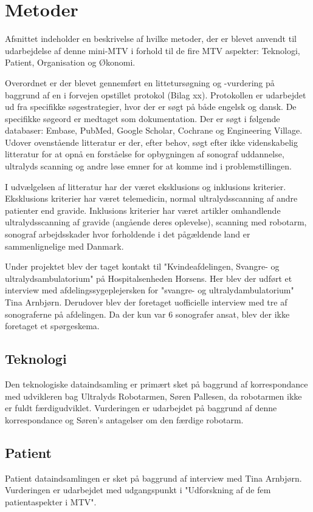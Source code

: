 \chapter{Metoder}
Afsnittet indeholder en beskrivelse af hvilke metoder, der er blevet anvendt til udarbejdelse af denne mini-MTV i forhold til de fire MTV aspekter: Teknologi, Patient, Organisation og Økonomi.

Overordnet er der blevet gennemført en littetursøgning og -vurdering på baggrund af en i forvejen opstillet protokol (Bilag xx). Protokollen er udarbejdet ud fra specifikke søgestrategier, hvor der er søgt på både engelsk og dansk. De specifikke søgeord er medtaget som dokumentation. Der er søgt i følgende databaser: Embase, PubMed, Google Scholar, Cochrane og Engineering Village. \\
Udover ovenstående litteratur er der, efter behov, søgt efter ikke videnskabelig litteratur for at opnå en forståelse for opbygningen af sonograf uddannelse, ultralyds scanning og andre løse emner for at komme ind i problemstillingen. 

I udvælgelsen af litteratur har der været eksklusions og inklusions kriterier. Eksklusions kriterier har været telemedicin, normal ultralydsscanning af andre patienter end gravide. Inklusions kriterier har været artikler omhandlende ultralydsscanning af gravide (angående deres oplevelse), scanning med robotarm, sonograf arbejdsskader hvor forholdende i det pågældende land er sammenlignelige med Danmark. 

Under projektet blev der taget kontakt til "Kvindeafdelingen, Svangre- og ultralydsambulatorium" på Hospitalsenheden Horsens. Her blev der udført et interview med afdelingssygeplejersken for "svangre- og ultralydambulatorium" Tina Arnbjørn. Derudover blev der foretaget uofficielle interview med tre af sonograferne på afdelingen. Da der kun var 6 sonografer ansat, blev der ikke foretaget et spørgeskema. 

\section{Teknologi}
Den teknologiske dataindsamling er primært sket på baggrund af korrespondance med udvikleren bag Ultralyds Robotarmen, Søren Pallesen, da robotarmen ikke er fuldt færdigudviklet. Vurderingen er udarbejdet på baggrund af denne korrespondance og Søren's antagelser om den færdige robotarm. 
\section{Patient}
Patient dataindsamlingen er sket på baggrund af interview med Tina Arnbjørn. Vurderingen er udarbejdet med udgangspunkt i "Udforskning af de fem patientaspekter i MTV". 
